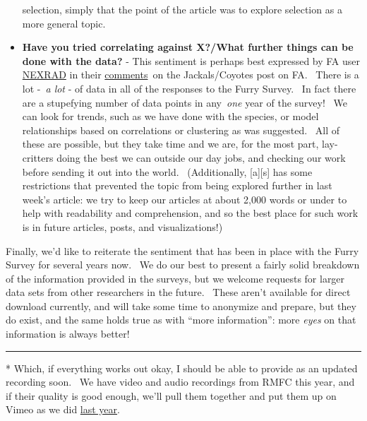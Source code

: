 \begin{itemize}
  selection, simply that the point of the article was to explore
  selection as a more general topic.\\
\item
  \textbf{Have you tried correlating against X?/What further things can
  be done with the data?} - This sentiment is perhaps best expressed by
  FA user \href{http://www.furaffinity.net/user/nexrad/}{NEXRAD} in
  their
  \href{http://www.furaffinity.net/view/11303171/\#cid:72968774}{comments}~on
  the Jackals/Coyotes post on FA. ~There is a lot -~\emph{a lot} - of
  data in all of the responses to the Furry Survey. ~In fact there are a
  stupefying number of data points in any~\emph{one} year of the survey!
  ~We can look for trends, such as we have done with the species, or
  model relationships based on correlations or clustering as was
  suggested. ~All of these are possible, but they take time and we are,
  for the most part, lay-critters doing the best we can outside our day
  jobs, and checking our work before sending it out into the world.
  ~(Additionally, {[}a{]}{[}s{]} has some restrictions that prevented
  the topic from being explored further in last week's article: we try
  to keep our articles at about 2,000 words or under to help with
  readability and comprehension, and so the best place for such work is
  in future articles, posts, and visualizations!)
\end{itemize}

Finally, we'd like to reiterate the sentiment that has been in place
with the Furry Survey for several years now. ~We do our best to present
a fairly solid breakdown of the information provided in the surveys, but
we welcome requests for larger data sets from other researchers in the
future. ~These aren't available for direct download currently, and will
take some time to anonymize and prepare, but they do exist, and the same
holds true as with ``more information'': more \emph{eyes} on that
information is always better!

\begin{center}\rule{0.5\linewidth}{\linethickness}\end{center}

* Which, if everything works out okay, I should be able to provide as an
updated recording soon. ~We have video and audio recordings from RMFC
this year, and if their quality is good enough, we'll pull them together
and put them up on Vimeo as we did
\href{https://vimeo.com/adjspecies}{last year}.
